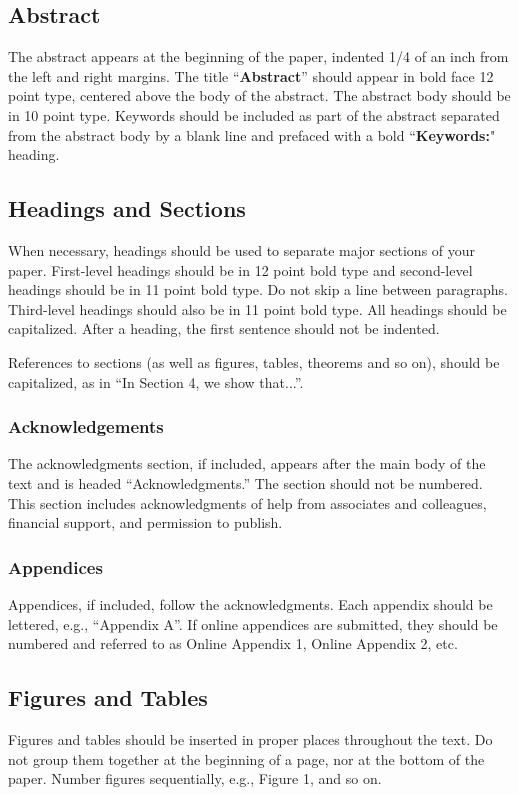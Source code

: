 \documentclass[twoside,11pt]{article}
\begin{document}
\subsection{Abstract}
The abstract appears at the beginning of the paper, indented 1/4 of an inch from the left and right margins. The title ``{\bf Abstract}'' should appear in bold face 12 point type, centered above the body of the abstract. The abstract body should be in 10 point type.  Keywords should be included as part of the abstract separated from the abstract body by a blank line and prefaced with a bold ``{\bf Keywords:}" heading. 

\subsection{Headings and Sections}
When necessary, headings should be used to separate major sections of your paper. First-level headings should be in 12 point bold type and second-level headings should be in 11 point bold type. Do not skip a line between paragraphs. Third-level headings should also be in 11 point bold type. All headings should be capitalized. After a heading, the first sentence should not be indented. 

References to sections (as well as figures, tables, theorems and so on), should be capitalized, as in ``In Section 4, we show that...''. 

\subsubsection{Acknowledgements}
The acknowledgments section, if included, appears after the main body of the text and is headed ``Acknowledgments.'' The section should not be numbered. This section includes acknowledgments of help from associates and colleagues, financial support, and permission to publish. 

\subsubsection{Appendices}
Appendices, if included, follow the acknowledgments. Each appendix should be lettered, e.g., ``Appendix A''. If online appendices are submitted, they should be numbered and referred to as Online Appendix 1, Online Appendix 2, etc. 

\subsection{Figures and Tables}
Figures and tables should be inserted in proper places throughout the text. Do not group them together at the beginning of a page, nor at the bottom of the paper. Number figures 
sequentially, e.g., Figure 1, and so on. 
\end{document}
